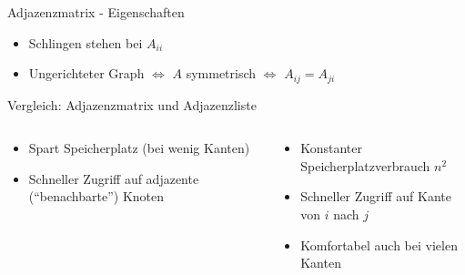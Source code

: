 \begin{frame}{Adjazenzmatrix - Eigenschaften}
    \begin{itemize}
        \item Schlingen stehen bei $A_{ii}$
        \item Ungerichteter Graph $\Leftrightarrow$ $A$ symmetrisch $\Leftrightarrow$ $A_{ij} = A_{ji}$
    \end{itemize}
\end{frame}
\begin{frame}{Vergleich: Adjazenzmatrix und Adjazenzliste}
    \begin{columns}
        \begin{column}{.5\textwidth}
            \begin{itemize}
                \item Spart Speicherplatz (bei wenig Kanten)
                \item Schneller Zugriff auf adjazente (``benachbarte'') Knoten
            \end{itemize}
        \end{column}
        \begin{column}{.5\textwidth}
            \begin{itemize}
                \item Konstanter Speicherplatzverbrauch $n^2$
                \item Schneller Zugriff auf Kante von $i$ nach $j$
                \item Komfortabel auch bei vielen Kanten
            \end{itemize}
        \end{column}
    \end{columns}
\end{frame}
